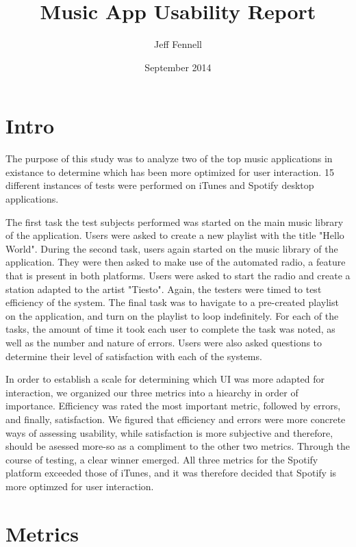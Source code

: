 \documentclass[12pt]{report}
\begin{document}
\title{Music App Usability Report}
\author{Jeff Fennell}
\date{September 2014}
\maketitle

\tableofcontents

\section{Intro}

The purpose of this study was to analyze two of the top music applications in existance to determine which has been more optimized for user interaction. 15 different instances of tests were performed on iTunes and Spotify desktop applications.

The first task the test subjects performed was started on the main music library of the application. Users were asked to create a new playlist with the title "Hello World".  During the second task, users again started on the music library of the application. They were then asked to make use of the automated radio, a feature that is present in both platforms. Users were asked to start the radio and create a station adapted to the artist "Tiesto". Again, the testers were timed to test efficiency of the system. The final task was to havigate to a pre-created playlist on the application, and turn on the playlist to loop indefinitely. For each of the tasks, the amount of time it took each user to complete the task was noted, as well as the number and nature of errors. Users were also asked questions to determine their level of satisfaction with each of the systems.

In order to establish a scale for determining which UI was more adapted for interaction, we organized our three metrics into a hiearchy in order of importance. Efficiency was rated the most important metric, followed by errors, and finally, satisfaction. We figured that efficiency and errors were more concrete ways of assessing usability, while satisfaction is more subjective and therefore, should be asessed more-so as a compliment to the other two metrics. Through the course of testing, a clear winner emerged. All three metrics for the Spotify platform exceeded those of iTunes, and it was therefore decided that Spotify is more optimzed for user interaction.

\section{Metrics}
\end{document}
